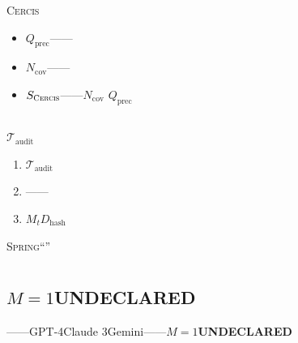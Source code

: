 \documentclass[12pt,a4paper]{article}
\theoremstyle{remark}
\newcommand{\Spring}{\textsc{Spring}}
\newcommand{\Cercis}{\textsc{Cercis}}
\begin{document}
\Cercis{}
\begin{itemize}[nosep]
    \item $Q_{\text{prec}}$——
    \item $N_{\text{cov}}$——
    \item $S_{\Cercis}$——$N_{\text{cov}}$
    $Q_{\text{prec}}$
\end{itemize}

\subsection{}

$\mathcal{T}_{\text{audit}}$\textbf{}

\begin{enumerate}[label=(\arabic*),itemsep=2pt]
    \item $\mathcal{T}_{\text{audit}}$
    \item ——
    \item $M_t$$D_{\text{hash}}$
\end{enumerate}

\textbf{}
\Spring{}“”

\newpage

\section{}

\subsection{$M=1$UNDECLARED}

——GPT-4Claude 3Gemini——\textbf{$M=1$UNDECLARED}
\end{document}

